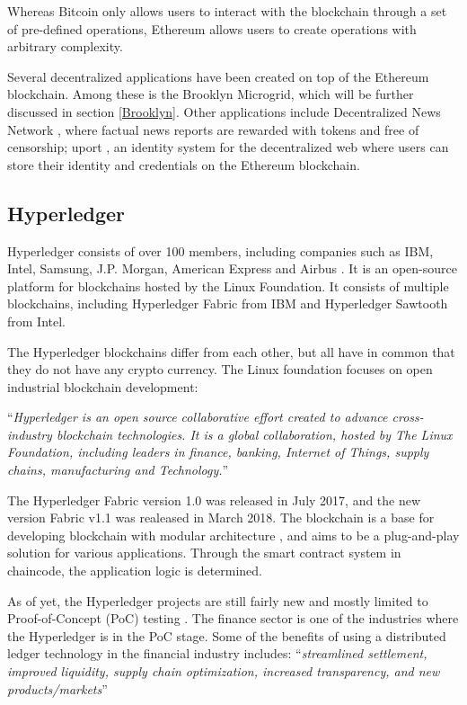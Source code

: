 Whereas Bitcoin only allows users to interact with the blockchain through a set of pre-defined operations, Ethereum allows users to create operations with arbitrary complexity.

Several decentralized applications have been created on top of the Ethereum blockchain. Among these is the Brooklyn Microgrid, which will be further discussed in section \ref{Brooklyn}. Other applications include Decentralized News Network \cite{DNN}, where factual news reports are rewarded with tokens and free of censorship; uport \cite{uport}, an identity system for the decentralized web where users can store their identity and credentials on the Ethereum blockchain.

\subsection{Hyperledger}
Hyperledger consists of over 100 members, including companies such as IBM, Intel, Samsung, J.P. Morgan, American Express and Airbus \cite{hyperledger}. It is an open-source platform for blockchains hosted by the Linux Foundation. It consists of multiple blockchains, including Hyperledger Fabric from IBM and Hyperledger Sawtooth from Intel. 

The Hyperledger blockchains differ from each other, but all have in common that they do not have any crypto currency. The Linux foundation focuses on open industrial blockchain development:

\enquote{\textit{Hyperledger is an open source collaborative effort created to advance cross-industry blockchain technologies. It is a global collaboration, hosted by The Linux Foundation, including leaders in finance, banking, Internet of Things, supply chains, manufacturing and Technology.}} \cite{hyperledger}

The Hyperledger Fabric version 1.0 was released in July 2017, and the new version Fabric v1.1 was realeased in March 2018. The blockchain is a base for developing blockchain with modular architecture \cite{fabric}, and aims to be a plug-and-play solution for various applications. Through the smart contract system in chaincode, the application logic is determined. 

As of yet, the Hyperledger projects are still fairly new and mostly limited to Proof-of-Concept (PoC) testing \cite{industries}. The finance sector is one of the industries where the Hyperledger is in the PoC stage. Some of the benefits of using a distributed ledger technology in the financial industry includes:
\enquote{\textit{streamlined settlement, improved liquidity, supply chain optimization, increased transparency, and new products/markets}}

